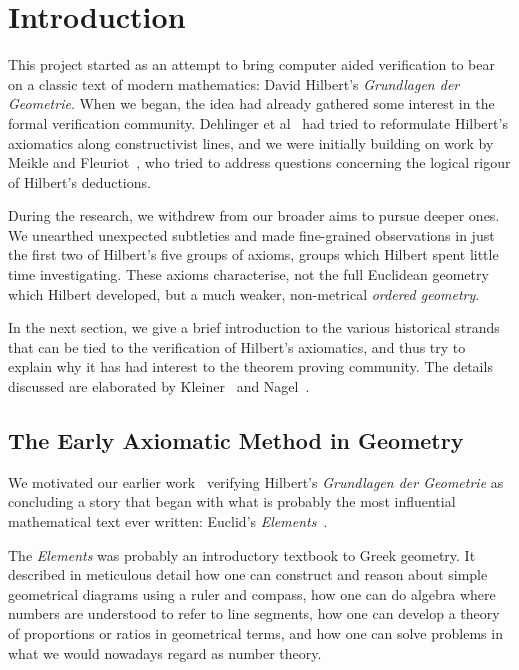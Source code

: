 \chapter{Introduction}\label{chapter:Introduction}
This project started as an attempt to bring computer aided verification to bear on a classic text of modern mathematics: David Hilbert's \emph{Grundlagen der Geometrie}. When we began, the idea had already gathered some interest in the formal verification community. Dehlinger et al~\cite{DehlingerFOG} had tried to reformulate Hilbert's axiomatics along constructivist lines, and we were initially building on work by Meikle and Fleuriot~\cite{MeikleFleuriotFormalizingHilbert}, who tried to address questions concerning the logical rigour of Hilbert's deductions. 

During the research, we withdrew from our broader aims to pursue deeper ones. We unearthed unexpected subtleties and made fine-grained observations in just the first two of Hilbert's five groups of axioms, groups which Hilbert spent little time investigating. These axioms characterise, not the full Euclidean geometry which Hilbert developed, but a much weaker, non-metrical \emph{ordered geometry}.

In the next section, we give a brief introduction to the various historical strands that can be tied to the verification of Hilbert's axiomatics, and thus try to explain why it has had interest to the theorem proving community. The details discussed are elaborated by Kleiner~\cite{RigourProof} and Nagel~\cite{NagelModernGeometry}.

\section{The Early Axiomatic Method in Geometry}
We motivated our earlier work~\cite{ScottMScThesis} verifying Hilbert's \emph{Grundlagen der Geometrie} as concluding a story that began with what is probably the most influential~\cite{BoyerEuclidInfluence} mathematical text ever written: Euclid's \emph{Elements}~\cite{HeathElements}. 

The \emph{Elements} was probably an introductory textbook to Greek geometry. It described in meticulous detail how one can construct and reason about simple geometrical diagrams using a ruler and compass, how one can do algebra where numbers are understood to refer to line segments, how one can develop a theory of proportions or ratios in geometrical terms, and how one can solve problems in what we would nowadays regard as number theory. 

